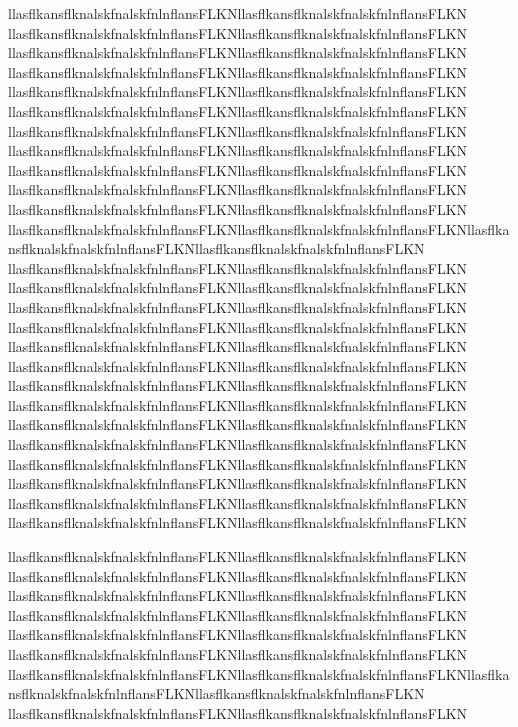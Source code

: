 \documentclass[final]{beamer}
\begin{document}
\begin{minipage}{0.5\textwidth}
    llasflkansflknalskfnalskfnlnflansFLKNllasflkansflknalskfnalskfnlnflansFLKN
    llasflkansflknalskfnalskfnlnflansFLKNllasflkansflknalskfnalskfnlnflansFLKN
    llasflkansflknalskfnalskfnlnflansFLKNllasflkansflknalskfnalskfnlnflansFLKN
    llasflkansflknalskfnalskfnlnflansFLKNllasflkansflknalskfnalskfnlnflansFLKN
    llasflkansflknalskfnalskfnlnflansFLKNllasflkansflknalskfnalskfnlnflansFLKN
    llasflkansflknalskfnalskfnlnflansFLKNllasflkansflknalskfnalskfnlnflansFLKN
    llasflkansflknalskfnalskfnlnflansFLKNllasflkansflknalskfnalskfnlnflansFLKN
    llasflkansflknalskfnalskfnlnflansFLKNllasflkansflknalskfnalskfnlnflansFLKN
    llasflkansflknalskfnalskfnlnflansFLKNllasflkansflknalskfnalskfnlnflansFLKN
    llasflkansflknalskfnalskfnlnflansFLKNllasflkansflknalskfnalskfnlnflansFLKN
    llasflkansflknalskfnalskfnlnflansFLKNllasflkansflknalskfnalskfnlnflansFLKN    llasflkansflknalskfnalskfnlnflansFLKNllasflkansflknalskfnalskfnlnflansFLKNllasflkansflknalskfnalskfnlnflansFLKNllasflkansflknalskfnalskfnlnflansFLKN    llasflkansflknalskfnalskfnlnflansFLKNllasflkansflknalskfnalskfnlnflansFLKN
    llasflkansflknalskfnalskfnlnflansFLKNllasflkansflknalskfnalskfnlnflansFLKN
    llasflkansflknalskfnalskfnlnflansFLKNllasflkansflknalskfnalskfnlnflansFLKN    llasflkansflknalskfnalskfnlnflansFLKNllasflkansflknalskfnalskfnlnflansFLKN
    llasflkansflknalskfnalskfnlnflansFLKNllasflkansflknalskfnalskfnlnflansFLKN
    llasflkansflknalskfnalskfnlnflansFLKNllasflkansflknalskfnalskfnlnflansFLKN
    llasflkansflknalskfnalskfnlnflansFLKNllasflkansflknalskfnalskfnlnflansFLKN
    llasflkansflknalskfnalskfnlnflansFLKNllasflkansflknalskfnalskfnlnflansFLKN
    llasflkansflknalskfnalskfnlnflansFLKNllasflkansflknalskfnalskfnlnflansFLKN
    llasflkansflknalskfnalskfnlnflansFLKNllasflkansflknalskfnalskfnlnflansFLKN
    llasflkansflknalskfnalskfnlnflansFLKNllasflkansflknalskfnalskfnlnflansFLKN
    llasflkansflknalskfnalskfnlnflansFLKNllasflkansflknalskfnalskfnlnflansFLKN
    llasflkansflknalskfnalskfnlnflansFLKNllasflkansflknalskfnalskfnlnflansFLKN
    llasflkansflknalskfnalskfnlnflansFLKNllasflkansflknalskfnalskfnlnflansFLKN
\end{minipage}
llasflkansflknalskfnalskfnlnflansFLKNllasflkansflknalskfnalskfnlnflansFLKN
    llasflkansflknalskfnalskfnlnflansFLKNllasflkansflknalskfnalskfnlnflansFLKN
    llasflkansflknalskfnalskfnlnflansFLKNllasflkansflknalskfnalskfnlnflansFLKN
    llasflkansflknalskfnalskfnlnflansFLKNllasflkansflknalskfnalskfnlnflansFLKN
    llasflkansflknalskfnalskfnlnflansFLKNllasflkansflknalskfnalskfnlnflansFLKN
    llasflkansflknalskfnalskfnlnflansFLKNllasflkansflknalskfnalskfnlnflansFLKN    llasflkansflknalskfnalskfnlnflansFLKNllasflkansflknalskfnalskfnlnflansFLKNllasflkansflknalskfnalskfnlnflansFLKNllasflkansflknalskfnalskfnlnflansFLKN    llasflkansflknalskfnalskfnlnflansFLKNllasflkansflknalskfnalskfnlnflansFLKN
\end{document}
